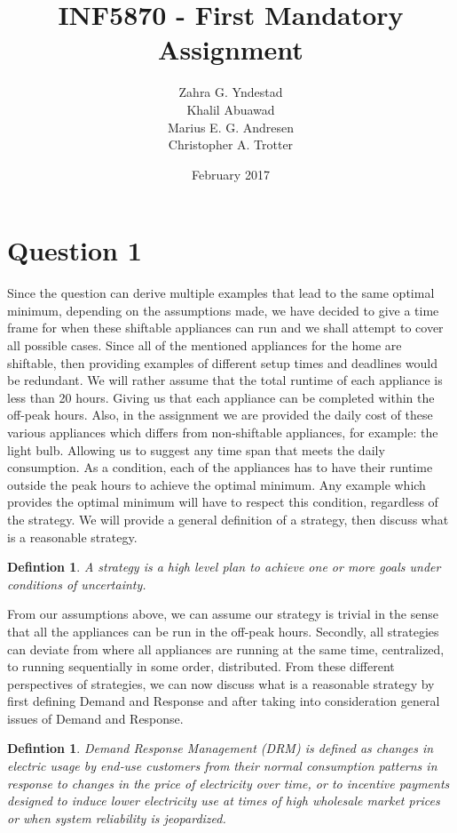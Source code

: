\documentclass{article}
\title{INF5870 - First Mandatory Assignment}
\author{Zahra G. Yndestad \\ Khalil Abuawad \\ Marius E. G. Andresen \\ Christopher A. Trotter}
\date{February 2017}
\newtheorem{definition}[theorem]{Defintion}
\begin{document}
\maketitle

\section{Question 1}
	Since the question can derive multiple examples that lead to the same optimal minimum, depending on the assumptions made, we have decided to give a time frame for when these shiftable appliances can run and we shall attempt to cover all possible cases. Since all of the mentioned appliances for the home are shiftable, then providing examples of different setup times and deadlines would be redundant. We will rather assume that the total runtime of each appliance is less than 20 hours. Giving us that each appliance can be completed within the off-peak hours. Also, in the assignment we are provided the daily cost of these various appliances which differs from non-shiftable appliances, for example: the light bulb. Allowing us to suggest any time span that meets the daily consumption.  As a condition, each of the appliances has to have their runtime outside the peak hours to achieve the optimal minimum. Any example which provides the optimal minimum will have to respect this condition, regardless of the strategy. We will provide a general definition of a strategy, then discuss what is a reasonable strategy.
	
	\begin{definition}
    	A strategy is a high level plan to achieve one or more goals under conditions of uncertainty{\cite{wikistrategy}}. 
	\end{definition}
	
	From our assumptions above, we can assume our strategy is trivial in the sense that all the appliances can be run in the off-peak hours. Secondly, all strategies can deviate from where all appliances are running at the same time, centralized, to running sequentially in some order, distributed. From these different perspectives of strategies, we can now discuss what is a reasonable strategy by first defining Demand and Response and after taking into consideration general issues of Demand and Response.
	
	\begin{definition}
	    Demand Response Management (DRM) is defined as changes in electric usage by end‐use customers from their normal consumption patterns in response to changes in the price of electricity over time, or to incentive payments designed to induce lower electricity use at times of high wholesale market prices or when system reliability is jeopardized\cite{defDRM}.
	\end{definition}
	
\end{document}
